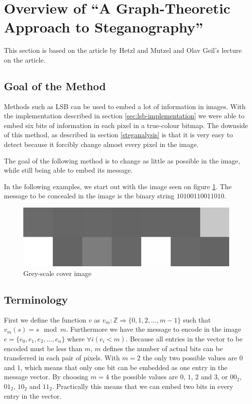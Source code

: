 \clearpage
\section{Overview of ``A Graph-Theoretic Approach to Steganography''}
\label{sec:graphtheory}
{\footnotesize This section is based on the article by Hetzl and Mutzel\citep{hetzl_2005} and Olav Geil's lecture on the article.}

\subsection*{Goal of the Method}
Methods such as LSB can be used to embed a lot of information in images. With the implementation described in section \ref{sec:lsb-implementation} we were able to embed six bits of information in each pixel in a true-colour bitmap. The downside of this method, as described in section \ref{steganalysis} is that it is very easy to detect because it forcibly change almost every pixel in the image. 

The goal of the following method is to change as little as possible in the image, while still being able to embed its message.

In the following examples, we start out with the image seen on figure \ref{fig:startingImage}. The message to be concealed in the image is the binary string $10100110011010$. 

\begin{figure}[h!]
	\centering
	\includegraphics[width=.4\textwidth, frame]{figures/pixelgrid.png}
	\caption{Grey-scale cover image}
	\label{fig:startingImage}
\end{figure}

\subsection*{Terminology}
First we define the function $v$ as $ v_m: \mathds{Z} \Rightarrow \{0,1,2,\ldots,m-1\} $ such that $ v_m(s) = s \mod m $. Furthermore we have the message to encode in the image $e = \{ e_0, e_1, e_2, \ldots, e_n \}$ where $\forall i\left( e_i < m \right)$. Because all entries in the vector to be encoded must be less than $m$, $m$ defines the number of actual bits can be transferred in each pair of pixels. With $m = 2$ the only two possible values are $0$ and $1$, which means that only one bit can be embedded as one entry in the message vector. By choosing $m = 4$ the possible values are $0$, $1$, $2$ and $3$, or $00_2$, $01_2$, $10_2$ and $11_2$. Practically this means that we can embed two bits in every entry in the vector.

